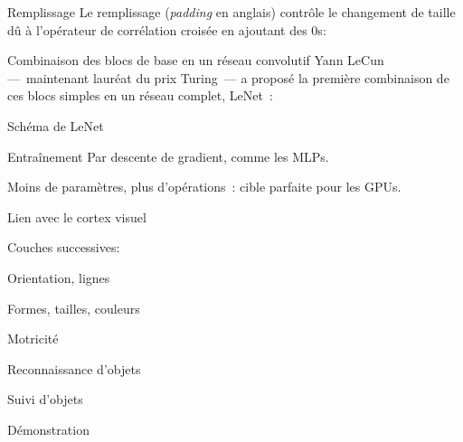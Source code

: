 \begin{frame}{Remplissage}
  Le remplissage (\textit{padding} en anglais) contrôle le changement de taille dû à l'opérateur de corrélation croisée en ajoutant des $0$s:

\end{frame}

\begin{frame}{Combinaison des blocs de base en un réseau convolutif}
  Yann LeCun ---~maintenant lauréat du prix Turing~--- a proposé la première combinaison de ces blocs simples en un réseau complet, LeNet~:

\end{frame}

\begin{frame}{Schéma de LeNet}
\end{frame}

\begin{frame}{Entraînement}
  Par descente de gradient, comme les MLPs.

  Moins de paramètres, plus d'opérations~: cible parfaite pour les GPUs.

\end{frame}

\begin{frame}{Lien avec le cortex visuel}
  \begin{minipage}[l]{0.50\linewidth}
  \end{minipage}\hfill
  \begin{minipage}[l]{0.49\linewidth}
    Couches successives:
    \begin{description}[<+(1)->]
    \item[V1] Orientation, lignes
    \item[V2] Formes, tailles, couleurs
    \item[V3] Motricité
    \item[V4] Reconnaissance d'objets
    \item[V5] Suivi d'objets
    \end{description}
  \end{minipage}\hfill
\end{frame}

\begin{frame}{Démonstration}
\end{frame}
